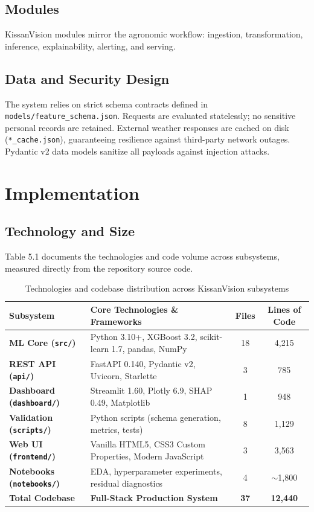 \documentclass[11pt,a4paper]{report}
\begin{document}
\section{Modules}
KissanVision modules mirror the agronomic workflow: ingestion, transformation, inference, explainability, alerting, and serving.

\section{Data and Security Design}
The system relies on strict schema contracts defined in \texttt{models/feature\_schema.json}. Requests are evaluated statelessly; no sensitive personal records are retained. External weather responses are cached on disk (\texttt{*\_cache.json}), guaranteeing resilience against third-party network outages. Pydantic v2 data models sanitize all payloads against injection attacks.

\chapter{Implementation}

\section{Technology and Size}
Table 5.1 documents the technologies and code volume across subsystems, measured directly from the repository source code.

\begin{table}[htbp]
\centering
\small
\caption{Technologies and codebase distribution across KissanVision subsystems}
\begin{tabularx}{\textwidth}{lXcc}
\toprule
\textbf{Subsystem} & \textbf{Core Technologies \& Frameworks} & \textbf{Files} & \textbf{Lines of Code} \\
\midrule
\textbf{ML Core (\texttt{src/})} & Python 3.10+, XGBoost 3.2, scikit-learn 1.7, pandas, NumPy & 18 & 4,215 \\
\textbf{REST API (\texttt{api/})} & FastAPI 0.140, Pydantic v2, Uvicorn, Starlette & 3 & 785 \\
\textbf{Dashboard (\texttt{dashboard/})} & Streamlit 1.60, Plotly 6.9, SHAP 0.49, Matplotlib & 1 & 948 \\
\textbf{Validation (\texttt{scripts/})} & Python scripts (schema generation, metrics, tests) & 8 & 1,129 \\
\textbf{Web UI (\texttt{frontend/})} & Vanilla HTML5, CSS3 Custom Properties, Modern JavaScript & 3 & 3,563 \\
\textbf{Notebooks (\texttt{notebooks/})}& EDA, hyperparameter experiments, residual diagnostics & 4 & $\sim$1,800 \\
\midrule
\textbf{Total Codebase} & \textbf{Full-Stack Production System} & \textbf{37} & \textbf{12,440} \\
\bottomrule
\end{tabularx}
\end{table}
\end{document}
